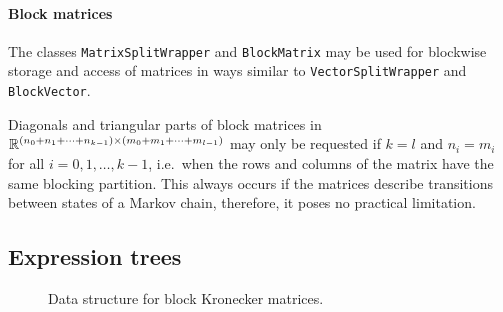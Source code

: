 \paragraph{Block matrices}

The classes \texttt{MatrixSplitWrapper} and \texttt{BlockMatrix} may
be used for blockwise storage and access of matrices in ways similar
to \texttt{VectorSplitWrapper} and \texttt{BlockVector}.

Diagonals and triangular parts of block matrices in $\mathbb{R}^{(n_0 + n_1 +
  \cdots + n_{k - 1}) \times (m_0 + m_1 + \cdots + m_{l - 1})}$ may
only be requested if $k = l$ and $n_i = m_i$ for all $i = 0, 1,
\ldots, k - 1$, i.e.~when the rows and columns of the matrix have the
same blocking partition. This always occurs if the matrices describe
transitions between states of a Markov chain, therefore, it poses no
practical limitation.

\subsection{Expression trees}

\begin{figure}
  \centering
  \caption{Data structure for block Kronecker matrices.}
  \label{fig:genstor:kronecker:datastructure}
\end{figure}

